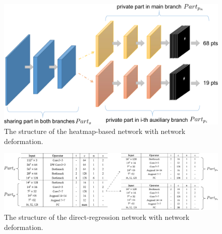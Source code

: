 \documentclass[journal,transmag]{IEEEtran}
\begin{document}


\begin{figure}[tbh]
   \centering
   \newpage
   \includegraphics[width=\linewidth]{resize_pipeline_heatmap.pdf}
   \caption{The structure of the heatmap-based network with network deformation.}
   \label{fig:HRNETMP}
\end{figure}


\begin{figure}[tbh]
   \centering
   \newpage
   \includegraphics[width=\linewidth]{resize_configuration_direct.eps}
   \caption{The structure of the direct-regression network with network deformation.}
   \label{fig:OCNMP}
 \end{figure}
\end{document}
